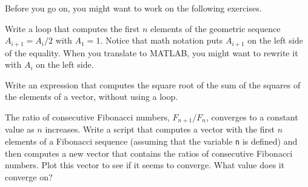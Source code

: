 Before you go on, you might want to work on the following exercises.

\begin{ex}
Write a loop that computes the first $n$ elements
of the geometric sequence $A_{i+1} = A_i/2$ with $A_1 = 1$.  Notice that
math notation puts $A_{i+1}$ on the left side of the equality.
When you translate to MATLAB, you might want to rewrite it with
$A_{i}$ on the left side.
\end{ex}


\begin{ex}
Write an expression that computes the square root of the sum of the squares of the elements of a vector, without using a loop.
\end{ex}



\begin{ex}
\label{fibratio}

The ratio of consecutive Fibonacci numbers, $F_{n+1}/F_{n}$, converges
to a constant value as $n$ increases.  Write a script that computes
a vector with the first $n$ elements of a Fibonacci sequence (assuming
that the variable \lstinline{n} is defined) and then computes a new
vector that contains the ratios of consecutive Fibonacci numbers.
Plot this vector to see if it seems to converge.  What value does
it converge on?


\end{ex}


